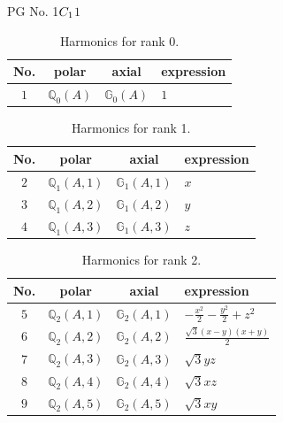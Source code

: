\documentclass[fleqn,8pt,landscape]{jsarticle}
\begin{document}
\setcounter{MaxMatrixCols}{32}

\renewcommand{\tablename}{Table~}
\renewcommand{\figurename}{Figure~}
\begin{center}
\LARGE
PG No. 1\quad$C_{\rm 1}$\quad$1$\quad[ triclinic ]
\end{center}
\begin{table}[ht!]
\begin{center}
\caption{Harmonics for rank 0.}
\renewcommand{\arraystretch}{1.3}
\begin{tabular}{cccl} \hline \hline
No. & polar & axial & expression \\ \hline
$ 1 $ & $ \mathbb{Q}_{0}(A) $ & $ \mathbb{G}_{0}(A) $ & $ 1 $ \\
 \hline \hline
\end{tabular}
\end{center}
\end{table}
\begin{table}[ht!]
\begin{center}
\caption{Harmonics for rank 1.}
\renewcommand{\arraystretch}{1.3}
\begin{tabular}{cccl} \hline \hline
No. & polar & axial & expression \\ \hline
$ 2 $ & $ \mathbb{Q}_{1}(A,1) $ & $ \mathbb{G}_{1}(A,1) $ & $ x $ \\
$ 3 $ & $ \mathbb{Q}_{1}(A,2) $ & $ \mathbb{G}_{1}(A,2) $ & $ y $ \\
$ 4 $ & $ \mathbb{Q}_{1}(A,3) $ & $ \mathbb{G}_{1}(A,3) $ & $ z $ \\
 \hline \hline
\end{tabular}
\end{center}
\end{table}
\begin{table}[ht!]
\begin{center}
\caption{Harmonics for rank 2.}
\renewcommand{\arraystretch}{1.3}
\begin{tabular}{cccl} \hline \hline
No. & polar & axial & expression \\ \hline
$ 5 $ & $ \mathbb{Q}_{2}(A,1) $ & $ \mathbb{G}_{2}(A,1) $ & $ - \frac{x^{2}}{2} - \frac{y^{2}}{2} + z^{2} $ \\
$ 6 $ & $ \mathbb{Q}_{2}(A,2) $ & $ \mathbb{G}_{2}(A,2) $ & $ \frac{\sqrt{3} \left(x - y\right) \left(x + y\right)}{2} $ \\
$ 7 $ & $ \mathbb{Q}_{2}(A,3) $ & $ \mathbb{G}_{2}(A,3) $ & $ \sqrt{3} y z $ \\
$ 8 $ & $ \mathbb{Q}_{2}(A,4) $ & $ \mathbb{G}_{2}(A,4) $ & $ \sqrt{3} x z $ \\
$ 9 $ & $ \mathbb{Q}_{2}(A,5) $ & $ \mathbb{G}_{2}(A,5) $ & $ \sqrt{3} x y $ \\
 \hline \hline
\end{tabular}
\end{center}
\end{table}
\end{document}
